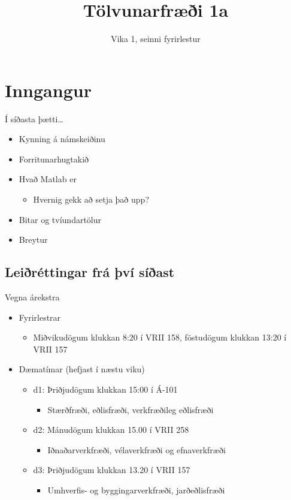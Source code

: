 \documentclass[handout]{beamer}
\title{Tölvunarfræði 1a}
\subtitle{Vika 1, seinni fyrirlestur}
\begin{document}
\begin{frame}
\titlepage
\end{frame}

\section{Inngangur}

\begin{frame}{Í síðasta þætti\ldots}
\begin{itemize}
 \item Kynning á námskeiðinu
 \item Forritunarhugtakið
 \item Hvað Matlab er
 \begin{itemize}
  \item Hvernig gekk að setja það upp?
 \end{itemize}
 \item Bitar og tvíundartölur
 \item Breytur
\end{itemize}
\end{frame}

\subsection{Leiðréttingar frá því síðast}

\begin{frame}{Vegna árekstra}
\begin{itemize}
 \item Fyrirlestrar
 \begin{itemize}
  \item Miðvikudögum klukkan 8:20 í VRII 158, föstudögum klukkan 13:20 í VRII 157
 \end{itemize}
 \item Dæmatímar (hefjast í næstu viku)
 \begin{itemize}
  \item d1: {\color{red} Þriðjudögum klukkan 15:00 í Á-101}
  \begin{itemize}
   \item Stærðfræði, eðlisfræði, verkfræðileg eðlisfræði %
  \end{itemize}
  \item d2: Mánudögum klukkan 15.00 í VRII 258
  \begin{itemize}
   \item Iðnaðarverkfræði, vélaverkfræði og efnaverkfræði %
  \end{itemize}
  \item d3: Þriðjudögum klukkan 13.20 í VRII 157
  \begin{itemize}
   \item Umhverfis- og byggingarverkfræði, jarðeðlisfræði %
  \end{itemize}
 \end{itemize}
\end{itemize} 
\end{frame}
\end{document}
